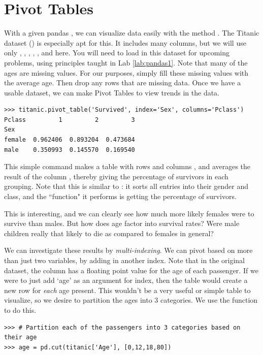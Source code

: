 \section*{Pivot Tables}
With a given pandas , we can visualize data easily with the method . The Titanic dataset () is especially apt for this.  It includes many columns, but we will use only , , , , , and  here.  You will need to load in this dataset for upcoming problems, using principles taught in Lab \ref{lab:pandas1}. Note that many of the ages are missing values.  For our purposes, simply fill these missing values with the average age.  Then drop any rows that are missing data. Once we have a usable dataset, we can make Pivot Tables to view trends in the data.

\begin{lstlisting}
>>> titanic.pivot_table('Survived', index='Sex', columns='Pclass')
Pclass         1         2         3
Sex                                 
female  0.962406  0.893204  0.473684
male    0.350993  0.145570  0.169540
\end{lstlisting}

This simple command makes a table with rows  and columns , and averages the result of the column , thereby giving the percentage of survivors in each grouping.  Note that this is similar to : it sorts all entries into their gender and class, and the ``function" it performs is getting the percentage of survivors.

This is interesting, and we can clearly see how much more likely females were to survive than males.  But how does age factor into survival rates? Were male children really that likely to die as compared to females in general?

We can investigate these results by \emph{multi-indexing}.  We can pivot based on more than just two variables, by adding in another index. Note that in the original dataset, the column  has a floating point value for the age of each passenger. If we were to just add `age' as an argument for index, then the table would create a new row for \emph{each} age present. This wouldn't be a very useful or simple table to visualize, so we desire to partition the ages into 3 categories. We use the function  to do this.

\begin{lstlisting}
>>> # Partition each of the passengers into 3 categories based on their age
>>> age = pd.cut(titanic['Age'], [0,12,18,80])
\end{lstlisting}

